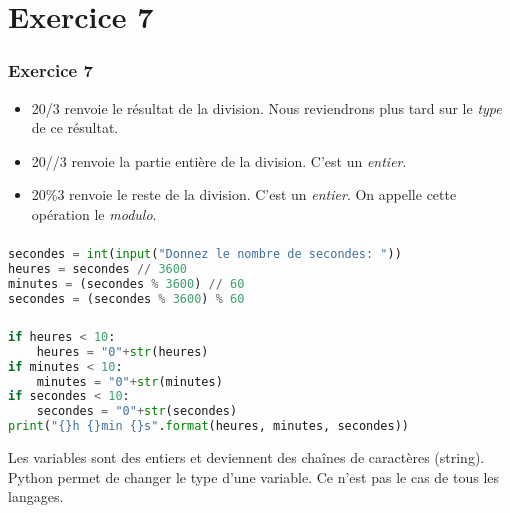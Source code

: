 \documentclass[svgnames,11pt]{beamer}
\begin{document}
\section{Exercice 7}
\begin{frame}
    \frametitle{Exercice 7}
    \begin{itemize}
        \item 20/3 renvoie le résultat de la division. Nous reviendrons plus tard sur le \emph{type} de ce résultat.
        \item 20//3 renvoie la partie entière de la division. C'est un \emph{entier}.
        \item 20\%3 renvoie le reste de la division. C'est un \emph{entier}. On appelle cette opération le \emph{modulo}.
        \end{itemize}
    

\end{frame}
\begin{frame}[fragile]
    \frametitle{}

\begin{center}
\begin{lstlisting}[language=Python , basicstyle=\ttfamily\small, xleftmargin=2em, xrightmargin=2em]
secondes = int(input("Donnez le nombre de secondes: "))
heures = secondes // 3600
minutes = (secondes % 3600) // 60
secondes = (secondes % 3600) % 60
\end{lstlisting}
\label{CODE}
\end{center}

\end{frame}
\begin{frame}[fragile]
    \frametitle{}

\begin{center}
\begin{lstlisting}[language=Python , basicstyle=\ttfamily\small, xleftmargin=2em, xrightmargin=2em]
if heures < 10:
    heures = "0"+str(heures)
if minutes < 10:
    minutes = "0"+str(minutes)
if secondes < 10:
    secondes = "0"+str(secondes)
print("{}h {}min {}s".format(heures, minutes, secondes))
\end{lstlisting}
\label{CODE}
\end{center}
\begin{aretenir}[Remarque]
Les variables sont des entiers et deviennent des chaînes de caractères (string). Python permet de changer le type d'une variable. Ce n'est pas le cas de tous les langages.
\end{aretenir}
\end{frame}
\end{document}
